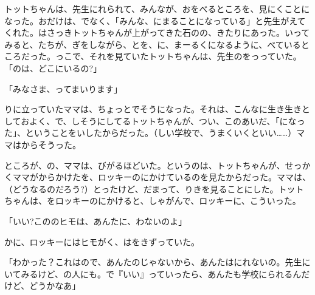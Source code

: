 トットちゃんは、先生にれられて、みんなが、おをべるところを、見にくことになった。おだけは、でなく、「みんな、にまることになっている」と先生がえてくれた。はさっきトットちゃんが上がってきた石のの、きたりにあった。いってみると、たちが、ぎをしながら、とを、に、まーるくになるように、べているところだった。っこで、それを見ていたトットちゃんは、先生のをっっていた。「のは、どこにいるの?」

「みなさま、ってまいります」

りに立っていたママは、ちょっとでそうになった。それは、こんなに生き生きとしておよく、で、しそうにしてるトットちゃんが、つい、このあいだ、「になった」、ということをいしたからだった。（しい学校で、うまくいくといい……）ママはからそうった。

ところが、の、ママは、びがるほどいた。というのは、トットちゃんが、せっかくママがからかけたを、ロッキーのにかけているのを見たからだった。ママは、（どうなるのだろう?）とったけど、だまって、りきを見ることにした。トットちゃんは、をロッキーのにかけると、しゃがんで、ロッキーに、こういった。

「いい?こののヒモは、あんたに、わないのよ」

かに、ロッキーにはヒモがく、はをきずっていた。

「わかった？これはので、あんたのじゃないから、あんたはにれないの。先生にいてみるけど、の人にも。で『いい』っていったら、あんたも学校にられるんだけど、どうかなあ」

